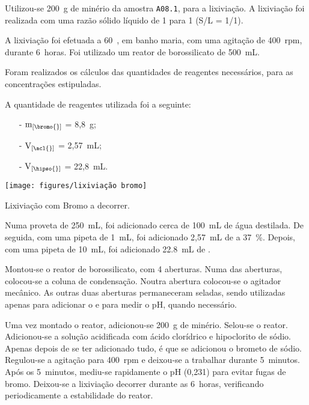 Utilizou-se 200~g de minério da amostra \texttt{A08.1}, para a lixiviação.
A lixiviação foi realizada com uma razão sólido líquido de 1 para 1 (S/L = 1/1).

A lixiviação foi efetuada a 60~\graus{}, em banho maria, com uma agitação de 400~rpm, durante 6~horas.
Foi utilizado um reator de borossilicato de 500~mL.

Foram realizados os cálculos das quantidades de reagentes necessários, para as concentrações estipuladas. 

A quantidade de reagentes utilizada foi a seguinte:
\begin{itemize}
    \item[-] $\mathrm{m}_{\left[\bromo{}\right]}$ = 8,8~g;
    \item[-] $\mathrm{V}_{\left[\acl{}\right]}$ = 2,57~mL;
    \item[-] $\mathrm{V}_{\left[\hipso{}\right]}$ = 22,8~mL.
\end{itemize}

\begin{marginfigure}
    \centering
    \texttt{[image: figures/lixiviação bromo]}
    \caption{Lixiviação com Bromo a decorrer.}
    \label{fig:lixiacao-bromo}
\end{marginfigure}

Numa proveta de 250~mL, foi adicionado cerca de 100~mL de água destilada.
De seguida, com uma pipeta de 1~mL, foi adicionado 2,57~mL de \acl{} a 37~\%.
Depois, com uma pipeta de 10~mL, foi adicionado 22.8~mL de \hipso{}.

Montou-se o reator de borossilicato, com 4 aberturas. 
Numa das aberturas, colocou-se a coluna de condensação. 
Noutra abertura colocou-se o agitador mecânico.
As outras duas aberturas permaneceram seladas, sendo utilizadas apenas para adicionar o \bromo{} e para medir o pH, quando necessário.


Uma vez montado o reator, adicionou-se 200~g de minério.
Selou-se o reator.
Adicionou-se a solução acidificada com ácido clorídrico e hipoclorito de sódio.
Apenas depois de se ter adicionado tudo, é que se adicionou o brometo de sódio.
Regulou-se a agitação para 400~rpm e deixou-se a trabalhar durante 5~minutos.
Após os 5~minutos, mediu-se rapidamente o pH (0,231) para evitar fugas de bromo.
Deixou-se a lixiviação decorrer durante as 6~horas, verificando periodicamente a estabilidade do reator.

